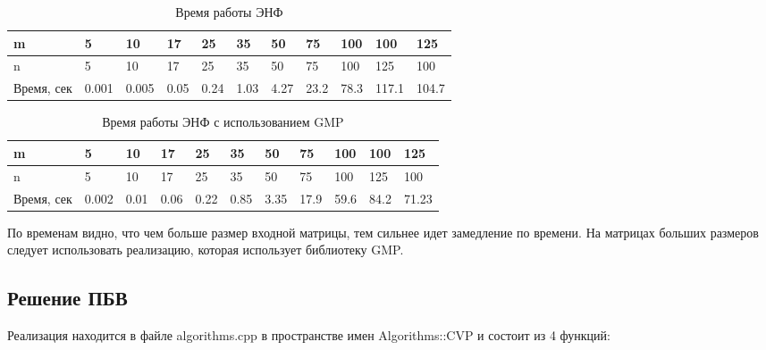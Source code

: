 \begin{table}[H]
  \caption{Время работы ЭНФ}
  \centering
  \begin{tabular}{ | l | l | l | l | l | l | l | l | l | l | l | }
  \hline
  m & 5 & 10 & 17 & 25 & 35 & 50 & 75 & 100 & 100 & 125 \\ \hline
  n & 5 & 10 & 17 & 25 & 35 & 50 & 75 & 100 & 125 & 100 \\ \hline
  Время, сек & 0.001 & 0.005 & 0.05 & 0.24 & 1.03 & 4.27 & 23.2 & 78.3 & 117.1 & 104.7 \\ \hline
  \end{tabular}
  \label{table:HNF}
\end{table}

\begin{table}[H]
  \caption{Время работы ЭНФ с использованием GMP}
  \centering
  \begin{tabular}{ | l | l | l | l | l | l | l | l | l | l | l | }
  \hline
  m & 5 & 10 & 17 & 25 & 35 & 50 & 75 & 100 & 100 & 125 \\ \hline
  n & 5 & 10 & 17 & 25 & 35 & 50 & 75 & 100 & 125 & 100 \\ \hline
  Время, сек & 0.002 & 0.01 & 0.06 & 0.22 & 0.85 & 3.35 & 17.9 & 59.6 & 84.2 & 71.23 \\ \hline
  \end{tabular}
  \label{table:HNF_GMP}
\end{table}

По временам видно, что чем больше размер входной матрицы, тем сильнее идет замедление по времени. На матрицах больших размеров следует использовать реализацию, которая использует библиотеку GMP.


\subsection{Решение ПБВ}

Реализация находится в файле algorithms.cpp в пространстве имен Algorithms::CVP и состоит из 4 функций:

